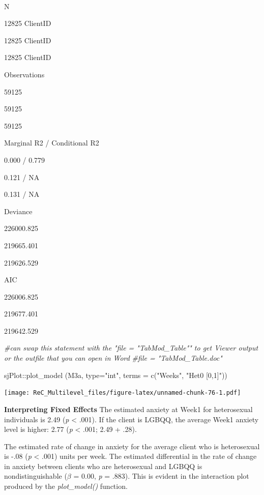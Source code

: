 \documentclass[
  11pt,
]{book}
\newenvironment{Shaded}{\begin{snugshade}}{\end{snugshade}}
\newcommand{\AttributeTok}[1]{\textcolor[rgb]{0.77,0.63,0.00}{#1}}
\newcommand{\CommentTok}[1]{\textcolor[rgb]{0.56,0.35,0.01}{\textit{#1}}}
\newcommand{\FunctionTok}[1]{\textcolor[rgb]{0.00,0.00,0.00}{#1}}
\newcommand{\NormalTok}[1]{#1}
\newcommand{\SpecialCharTok}[1]{\textcolor[rgb]{0.00,0.00,0.00}{#1}}
\newcommand{\StringTok}[1]{\textcolor[rgb]{0.31,0.60,0.02}{#1}}
\begin{document}
~

N

12825 ClientID

12825 ClientID

12825 ClientID

Observations

59125

59125

59125

Marginal R2 / Conditional R2

0.000 / 0.779

0.121 / NA

0.131 / NA

Deviance

226000.825

219665.401

219626.529

AIC

226006.825

219677.401

219642.529

\begin{Shaded}
\begin{Highlighting}[]
\CommentTok{\#can swap this statement with the "file = "TabMod\_Table"" to get Viewer output or the outfile that you can open in Word}
\CommentTok{\#file = "TabMod\_Table.doc"}
\end{Highlighting}
\end{Shaded}

\begin{Shaded}
\begin{Highlighting}[]
\NormalTok{sjPlot}\SpecialCharTok{::}\FunctionTok{plot\_model}\NormalTok{ (M3a, }\AttributeTok{type=}\StringTok{"int"}\NormalTok{, }\AttributeTok{terms =} \FunctionTok{c}\NormalTok{(}\StringTok{"Weeks"}\NormalTok{, }\StringTok{"Het0 [0,1]"}\NormalTok{))}
\end{Highlighting}
\end{Shaded}

\texttt{[image: ReC\_Multilevel\_files/figure-latex/unnamed-chunk-76-1.pdf]}

\textbf{Interpreting Fixed Effects}
The estimated anxiety at Week1 for heterosexual individuals is 2.49 (\emph{p} \textless{} .001). If the client is LGBQQ, the average Week1 anxiety level is higher: 2.77 (\emph{p} \textless{} .001; 2.49 + .28).

The estimated rate of change in anxiety for the average client who is heterosexual is -.08 (\emph{p} \textless{} .001) units per week. The estimated differential in the rate of change in anxiety between clients who are heterosexual and LGBQQ is nondistinguishable (\(\beta\) = 0.00, \emph{p} = .883). This is evident in the interaction plot produced by the \emph{plot\_model()} function.
\end{document}

